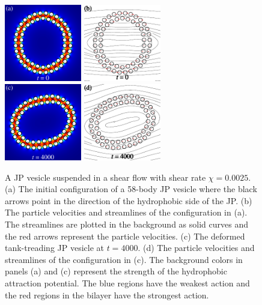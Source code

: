 \documentclass[lineno]{jfm}
\begin{document}
\begin{figure}
\centering
\includegraphics[width=0.3\textwidth]{N58_0.pdf}
\includegraphics[width=0.3\textwidth]{N58_vel_0.pdf}\\
\includegraphics[width=0.3\textwidth]{N58_20000.pdf}
\includegraphics[width=0.3\textwidth]{N58_vel_20000.pdf}
  \caption{\label{figure3} A JP vesicle suspended in a shear flow with
  shear rate $\chi=0.0025$. (a) The initial configuration of a 58-body
  JP vesicle where the black arrows point in the direction of the
  hydrophobic side of the JP. (b) The particle velocities and
  streamlines of the configuration in (a). The streamlines are plotted
  in the background as solid curves and the red arrows represent the
  particle velocities. (c) The deformed tank-treading JP vesicle at
  $t=4000$. (d) The particle velocities and streamlines of the
  configuration in (c). The background colors in panels (a) and (c)
  represent the strength of the hydrophobic attraction potential. The
  blue regions have the weakest action and the red regions in the
  bilayer have the strongest action.}
\end{figure}
%
\end{document}
